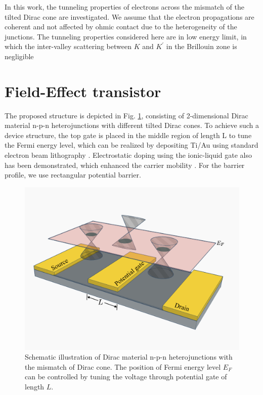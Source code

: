 In this work, the tunneling properties of electrons across the mismatch of the tilted Dirac cone are investigated.
We assume that the electron propagations are coherent and not affected by ohmic contact due to the heterogeneity of the junctions. 
The tunneling properties considered here are in low energy limit, in which the inter-valley scattering between $K$ and $K^\prime$ in the Brillouin zone is negligible \cite{Abergel2009}
\section{Field-Effect transistor}
    The proposed structure is depicted in Fig. \ref{fig:transistor}, consisting of 2-dimensional Dirac material n-p-n heterojunctions with different tilted Dirac cones. 
    To achieve such a device structure, the top gate is placed in the middle region of length L to tune the Fermi energy level, which can be realized by depositing Ti/Au using standard electron beam lithography \cite{Huard2007}.
    Electrostatic doping using the ionic-liquid gate also has been demonstrated, which enhanced the carrier mobility \cite{Perera2013}. 
    For the barrier profile, we use rectangular potential barrier.
    \begin{figure}[H]
        \centering
        \includegraphics[width=0.6\linewidth]{fig/Transistor.png}
        \caption{Schematic illustration of Dirac material n-p-n heterojunctions with the mismatch of Dirac cone. 
                    The position of Fermi energy level $E_F$ can be controlled by tuning the voltage through potential gate of length $L$.}
        \label{fig:transistor}
    \end{figure}

